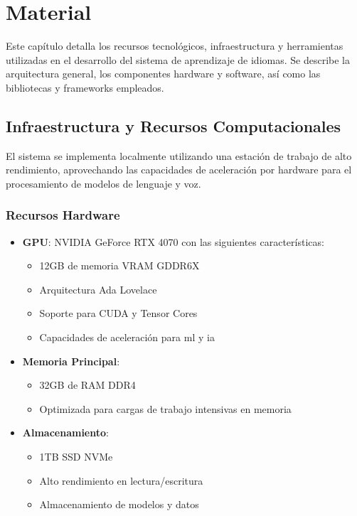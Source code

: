 \chapter{Material}
\label{material}

Este capítulo detalla los recursos tecnológicos, infraestructura y herramientas utilizadas en el desarrollo del sistema de aprendizaje de idiomas. Se describe la arquitectura general, los componentes hardware y software, así como las bibliotecas y frameworks empleados.

\section{Infraestructura y Recursos Computacionales}

El sistema se implementa localmente utilizando una estación de trabajo de alto rendimiento, aprovechando las capacidades de aceleración por hardware para el procesamiento de modelos de lenguaje y voz.

\subsection{Recursos Hardware}

\begin{itemize}
    \item \textbf{GPU}: NVIDIA GeForce RTX 4070 con las siguientes características:
    \begin{itemize}
        \item 12GB de memoria VRAM GDDR6X
        \item Arquitectura Ada Lovelace
        \item Soporte para CUDA y Tensor Cores
        \item Capacidades de aceleración para \gls{ml} y \gls{ia}
    \end{itemize}
    
    \item \textbf{Memoria Principal}:
    \begin{itemize}
        \item 32GB de RAM DDR4
        \item Optimizada para cargas de trabajo intensivas en memoria
    \end{itemize}
    
    \item \textbf{Almacenamiento}:
    \begin{itemize}
        \item 1TB SSD NVMe
        \item Alto rendimiento en lectura/escritura
        \item Almacenamiento de modelos y datos
    \end{itemize}
\end{itemize}


